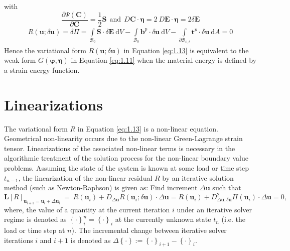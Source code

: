 with 
\begin{equation}
\dfrac{\partial \Psi (\mathbf{C})}{\partial \mathbf{C}} = \dfrac{1}{2} \mathbf{S} \ \ \text{and} \ \ D \mathbf{C} \cdot \bm{\eta} = 2 \ D \mathbf{E} \cdot \bm{\eta} = 2 \delta \mathbf{E}
\label{eq:1.12.2}
\end{equation}
\begin{align}
R(\mathbf{u}; \delta \mathbf{u}) =\delta \Pi = \int\limits_{\mathcal{B}_0} \mathbf{S} \cdot \delta \mathbf{E} \ \mathrm{d}V - \int\limits_{\mathcal{B}_0} \mathbf{b}^p \cdot \delta \mathbf{u} \ \mathrm{d}V - \int\limits_{\mathcal{\partial B}_{0,t}} \mathbf{t}^p \cdot \delta \mathbf{u} \ \mathrm{d}A = 0 
\label{eq:1.13}
\end{align}
Hence the variational form $R(\mathbf{u}; \delta \mathbf{u})$ in Equation \eqref{eq:1.13} is equivalent to the weak form $G(\bm{\varphi},\bm{\eta})$ in Equation \eqref{eq:1.11} when the material energy is defined by a strain energy function. 

\section{Linearizations}
The variational form $R$ in Equation \eqref{eq:1.13} is a non-linear equation. Geometrical non-linearity occurs due to the non-linear Green-Lagrange strain tensor. Linearizations of the associated non-linear terms is necessary in the algorithmic treatment of the solution process for the non-linear boundary value problems. Assuming the state of the system is known at some load or time step $t_{n-1}$, the linearization of the non-linear residual $R$ by an iterative solution method (such as Newton-Raphson) is given as: Find increment $\Delta \mathbf{u}$ such that 
\begin{equation}
\mathbf{L}\left[ R \right]_{\mathbf{u}_{i+1} = \mathbf{u}_{i} + \Delta \mathbf{u}_i} \ = \ R(\mathbf{u}_{i}) + D_{\Delta\mathbf{u}} R(\mathbf{u}_i; \delta \mathbf{u}) \cdot \Delta\mathbf{u} = R(\mathbf{u}_{i}) + D^2_{\Delta\mathbf{u}, \delta\mathbf{u}} \Pi(\mathbf{u}_{i}) \cdot \Delta\mathbf{u} = 0,
\label{eq:1.14}
\end{equation}
where, the value of a quantity at the current iteration $i$ under an iterative solver regime is denoted as ${\left\lbrace \cdot \right\rbrace}_{i}^{n} = {\left\lbrace \cdot \right\rbrace}_{i}$ at the currently unknown state $t_n$ (i.e. the load or time step at $n$). The incremental change between iterative solver iterations $i$ and $i+1$ is denoted as $\Delta \left\lbrace \cdot \right\rbrace := {\left\lbrace \cdot \right\rbrace}_{i+1} - {\left\lbrace \cdot \right\rbrace}_{i}$. \par 

